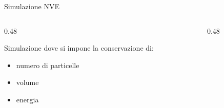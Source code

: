\begin{frame}{Simulazione NVE}
    \begin{columns}[c]        
        \begin{column}{0.48\textwidth}
        
        Simulazione dove si impone la conservazione di:
        \begin{itemize}
        	\item[-] numero di particelle
        	\item[-] volume
        	\item[-] energia
        \end{itemize}
        
        \end{column}
        \begin{column}{0.48\textwidth}
        
            \centering
            
            \vspace{0.4cm} %
            
            
        \end{column}
    \end{columns}
\end{frame}

